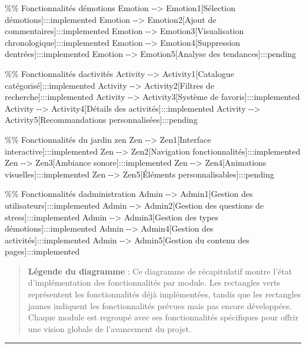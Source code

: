 \documentclass[
]{article}
\newenvironment{Shaded}{}{}
\newcommand{\NormalTok}[1]{#1}
\begin{document}
\begin{Shaded}
\begin{Highlighting}[]
\NormalTok{    \%\% Fonctionnalités d\textquotesingle{}émotions}
\NormalTok{    Emotion {-}{-}\textgreater{} Emotion1[Sélection d\textquotesingle{}émotions]:::implemented}
\NormalTok{    Emotion {-}{-}\textgreater{} Emotion2[Ajout de commentaires]:::implemented}
\NormalTok{    Emotion {-}{-}\textgreater{} Emotion3[Visualisation chronologique]:::implemented}
\NormalTok{    Emotion {-}{-}\textgreater{} Emotion4[Suppression d\textquotesingle{}entrées]:::implemented}
\NormalTok{    Emotion {-}{-}\textgreater{} Emotion5[Analyse des tendances]:::pending}
    
\NormalTok{    \%\% Fonctionnalités d\textquotesingle{}activités}
\NormalTok{    Activity {-}{-}\textgreater{} Activity1[Catalogue catégorisé]:::implemented}
\NormalTok{    Activity {-}{-}\textgreater{} Activity2[Filtres de recherche]:::implemented}
\NormalTok{    Activity {-}{-}\textgreater{} Activity3[Système de favoris]:::implemented}
\NormalTok{    Activity {-}{-}\textgreater{} Activity4[Détails des activités]:::implemented}
\NormalTok{    Activity {-}{-}\textgreater{} Activity5[Recommandations personnalisées]:::pending}
    
\NormalTok{    \%\% Fonctionnalités du jardin zen}
\NormalTok{    Zen {-}{-}\textgreater{} Zen1[Interface interactive]:::implemented}
\NormalTok{    Zen {-}{-}\textgreater{} Zen2[Navigation fonctionnalités]:::implemented}
\NormalTok{    Zen {-}{-}\textgreater{} Zen3[Ambiance sonore]:::implemented}
\NormalTok{    Zen {-}{-}\textgreater{} Zen4[Animations visuelles]:::implemented}
\NormalTok{    Zen {-}{-}\textgreater{} Zen5[Éléments personnalisables]:::pending}
    
\NormalTok{    \%\% Fonctionnalités d\textquotesingle{}administration}
\NormalTok{    Admin {-}{-}\textgreater{} Admin1[Gestion des utilisateurs]:::implemented}
\NormalTok{    Admin {-}{-}\textgreater{} Admin2[Gestion des questions de stress]:::implemented}
\NormalTok{    Admin {-}{-}\textgreater{} Admin3[Gestion des types d\textquotesingle{}émotions]:::implemented}
\NormalTok{    Admin {-}{-}\textgreater{} Admin4[Gestion des activités]:::implemented}
\NormalTok{    Admin {-}{-}\textgreater{} Admin5[Gestion du contenu des pages]:::implemented}
\end{Highlighting}
\end{Shaded}

\begin{quote}
\textbf{Légende du diagramme} : Ce diagramme de récapitulatif montre
l’état d’implémentation des fonctionnalités par module. Les rectangles
verts représentent les fonctionnalités déjà implémentées, tandis que les
rectangles jaunes indiquent les fonctionnalités prévues mais pas encore
développées. Chaque module est regroupé avec ses fonctionnalités
spécifiques pour offrir une vision globale de l’avancement du projet.
\end{quote}

\begin{center}\rule{0.5\linewidth}{0.5pt}\end{center}
\end{document}
